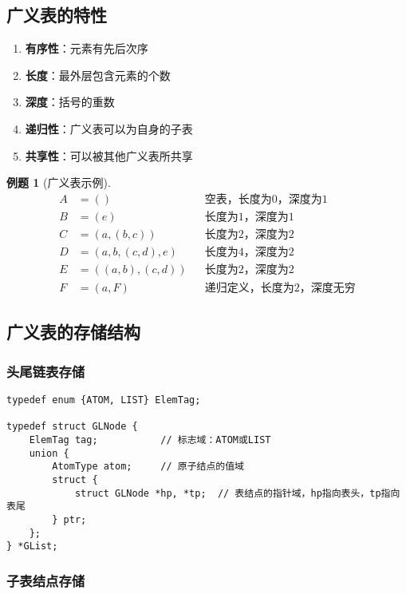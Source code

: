 \documentclass[12pt,a4paper]{amsart}
\newtheorem{example}{例题}[section]
\begin{document}
\subsection{广义表的特性}

\begin{enumerate}
\item \textbf{有序性}：元素有先后次序
\item \textbf{长度}：最外层包含元素的个数
\item \textbf{深度}：括号的重数
\item \textbf{递归性}：广义表可以为自身的子表
\item \textbf{共享性}：可以被其他广义表所共享
\end{enumerate}

\begin{example}[广义表示例]
\begin{align}
A &= () && \text{空表，长度为0，深度为1} \\
B &= (e) && \text{长度为1，深度为1} \\
C &= (a, (b, c)) && \text{长度为2，深度为2} \\
D &= (a, b, (c, d), e) && \text{长度为4，深度为2} \\
E &= ((a, b), (c, d)) && \text{长度为2，深度为2} \\
F &= (a, F) && \text{递归定义，长度为2，深度无穷}
\end{align}
\end{example}

\subsection{广义表的存储结构}

\subsubsection{头尾链表存储}

\indent

\begin{lstlisting}[caption=头尾链表结构定义]
typedef enum {ATOM, LIST} ElemTag;

typedef struct GLNode {
    ElemTag tag;           // 标志域：ATOM或LIST
    union {
        AtomType atom;     // 原子结点的值域
        struct {
            struct GLNode *hp, *tp;  // 表结点的指针域，hp指向表头，tp指向表尾
        } ptr;
    };
} *GList;
\end{lstlisting}

\subsubsection{子表结点存储}
\end{document}
